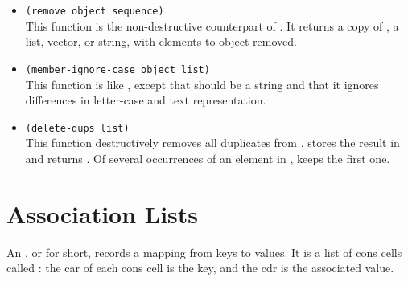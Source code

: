 \begin{itemize}
\begin{lstlisting}
(setq l [(2) (1) (2)])                  ; [(2) (1) (2)]
(delete '(2) l)                         ; [(1)]
l                                       ; [(2) (1) (2)]
\end{lstlisting}
\item \lstinline|(remove object sequence)|\\
  This function is the non-destructive counterpart of .
  It returns a copy of , a list, vector, or string, with elements  to \argument{}object removed.
\item \lstinline|(member-ignore-case object list)|\\
  This function is like , except that  should be a string and that it ignores differences in letter-case and text representation.
\item \lstinline|(delete-dups list)|\\
  This function destructively removes all  duplicates from , stores the result in  and returns .
  Of several  occurrences of an element in ,  keeps the first one.
\end{itemize}


\section{Association Lists}
\label{sec:association-lists}


An , or  for short, records a mapping from keys to values.
It is a list of cons cells called : the car of each cons cell is the key, and the cdr is the associated value.

